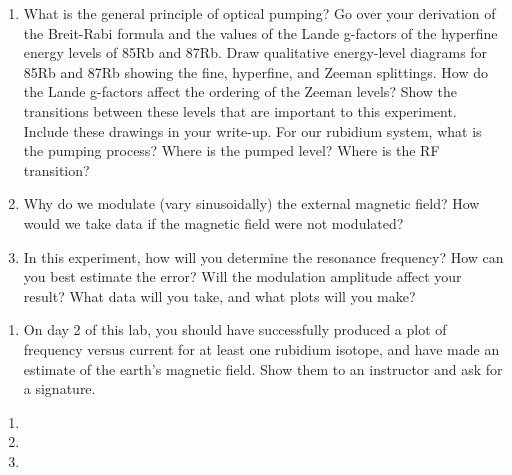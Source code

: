 \documentclass{../signatures}
\begin{document}
\maketitle

\names

\prelab

\begin{enumerate}

    \item What is the general principle of optical pumping? Go over your derivation of the Breit-Rabi formula and the values of the Lande g-factors of the hyperfine energy levels of 85Rb and 87Rb. Draw qualitative energy-level diagrams for 85Rb and 87Rb showing the fine, hyperfine, and Zeeman splittings. How do the Lande g-factors affect the ordering of the Zeeman levels? Show the transitions between these levels that are important to this experiment. Include these drawings in your write-up. For our rubidium system, what is the pumping process? Where is the pumped level? Where is the RF transition?
    
    \item Why do we modulate (vary sinusoidally) the external magnetic field? How would we take data if the magnetic field were not modulated?

    \item In this experiment, how will you determine the resonance frequency? How can you best estimate the error? Will the modulation amplitude affect your result? What data will you take, and what plots will you make?
       \\[36pt]
\end{enumerate}

\prelabsignatures

\midlab

\begin{enumerate}

    \item On day 2 of this lab, you should have successfully produced a plot of frequency versus current for at least one rubidium isotope, and have made an estimate of the earth’s magnetic field. Show them to an instructor and ask for a signature.
\\[36pt]
\end{enumerate}


\checkpointsection 

\begin{enumerate}

\item {}

\item {}

\item {}

\end{enumerate}
\end{document}
